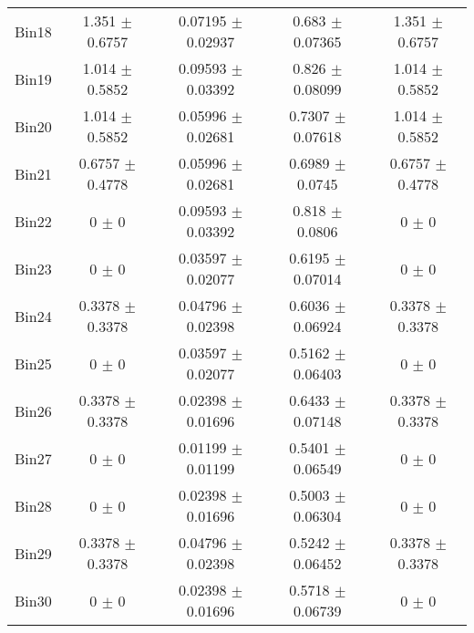 \begin{tabular}{@{\extracolsep{4pt}}lcccc@{}}
     Bin18 & 1.351 $\pm$ 0.6757 & 0.07195 $\pm$ 0.02937 & 0.683 $\pm$ 0.07365 & 1.351 $\pm$ 0.6757 \\ 
     Bin19 & 1.014 $\pm$ 0.5852 & 0.09593 $\pm$ 0.03392 & 0.826 $\pm$ 0.08099 & 1.014 $\pm$ 0.5852 \\ 
     Bin20 & 1.014 $\pm$ 0.5852 & 0.05996 $\pm$ 0.02681 & 0.7307 $\pm$ 0.07618 & 1.014 $\pm$ 0.5852 \\ 
     Bin21 & 0.6757 $\pm$ 0.4778 & 0.05996 $\pm$ 0.02681 & 0.6989 $\pm$ 0.0745 & 0.6757 $\pm$ 0.4778 \\ 
     Bin22 & 0 $\pm$ 0 & 0.09593 $\pm$ 0.03392 & 0.818 $\pm$ 0.0806 & 0 $\pm$ 0 \\ 
     Bin23 & 0 $\pm$ 0 & 0.03597 $\pm$ 0.02077 & 0.6195 $\pm$ 0.07014 & 0 $\pm$ 0 \\ 
     Bin24 & 0.3378 $\pm$ 0.3378 & 0.04796 $\pm$ 0.02398 & 0.6036 $\pm$ 0.06924 & 0.3378 $\pm$ 0.3378 \\ 
     Bin25 & 0 $\pm$ 0 & 0.03597 $\pm$ 0.02077 & 0.5162 $\pm$ 0.06403 & 0 $\pm$ 0 \\ 
     Bin26 & 0.3378 $\pm$ 0.3378 & 0.02398 $\pm$ 0.01696 & 0.6433 $\pm$ 0.07148 & 0.3378 $\pm$ 0.3378 \\ 
     Bin27 & 0 $\pm$ 0 & 0.01199 $\pm$ 0.01199 & 0.5401 $\pm$ 0.06549 & 0 $\pm$ 0 \\ 
     Bin28 & 0 $\pm$ 0 & 0.02398 $\pm$ 0.01696 & 0.5003 $\pm$ 0.06304 & 0 $\pm$ 0 \\ 
     Bin29 & 0.3378 $\pm$ 0.3378 & 0.04796 $\pm$ 0.02398 & 0.5242 $\pm$ 0.06452 & 0.3378 $\pm$ 0.3378 \\ 
     Bin30 & 0 $\pm$ 0 & 0.02398 $\pm$ 0.01696 & 0.5718 $\pm$ 0.06739 & 0 $\pm$ 0 \\ 
\hline\hline
  \end{tabular}
